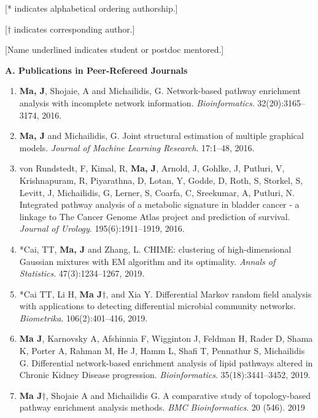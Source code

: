 \documentclass[10pt]{article}
\begin{document}
[* indicates alphabetical ordering authorship.]

[$\dagger$ indicates corresponding author.]

[Name underlined indicates student or postdoc mentored.]

\medskip

\textbf{A. Publications in Peer-Refereed Journals}

\begin{enumerate}
\item \textbf{Ma, J}, Shojaie, A and Michailidis, G. Network-based pathway enrichment analysis with incomplete network information. {\em Bioinformatics}. 32(20):3165--3174, 2016.
\item \textbf{Ma, J} and Michailidis, G. Joint structural estimation of multiple graphical models. {\em Journal of Machine Learning Research}. 17:1--48, 2016.
\item von Rundstedt, F, Kimal, R, \textbf{Ma, J}, Arnold, J, Gohlke, J, Putluri, V, Krishnapuram, R, Piyarathna, D, Lotan, Y, Godde, D, Roth, S, Storkel, S, Levitt, J, Michailidis, G, Lerner, S, Coarfa, C, Sreekumar, A, Putluri, N. Integrated pathway analysis of a metabolic signature in bladder cancer - a linkage to The Cancer Genome Atlas project and prediction of survival. {\em Journal of Urology}. 195(6):1911--1919, 2016.
\item *Cai, TT, \textbf{Ma, J} and Zhang, L. CHIME: clustering of high-dimensional Gaussian mixtures with EM algorithm and its optimality. {\em Annals of Statistics}. 47(3):1234--1267, 2019. 
 \item *Cai TT, Li H, \textbf{Ma J}$\dagger$, and Xia Y. Differential Markov random field analysis with applications to detecting differential microbial community networks. {\em Biometrika}. 106(2):401--416, 2019. 
 \item \textbf{Ma J}, Karnovsky A, Afshinnia F, Wigginton J, Feldman H, Rader D, Shama K, Porter A, Rahman M, He J, Hamm L, Shafi T, Pennathur S, Michailidis G. Differential network-based enrichment analysis of lipid pathways altered in Chronic Kidney Disease progression. {\em Bioinformatics}. 35(18):3441--3452, 2019.
 \item \textbf{Ma J}{$\dagger$}, Shojaie A and Michailidis G. A comparative study of topology-based pathway enrichment analysis methods. {\em BMC Bioinformatics}. 20 (546). 2019 

\end{enumerate}
\end{document}
